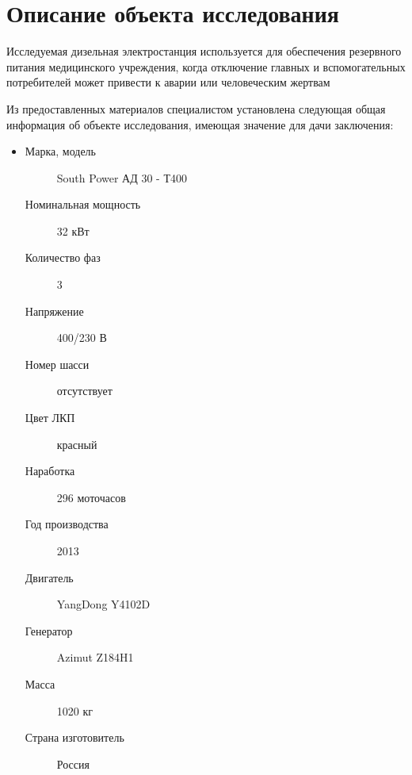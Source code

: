 %
%
%

\section{Описание объекта исследования}

Исследуемая дизельная электростанция используется для обеспечения резервного питания медицинского учреждения, когда  отключение главных и вспомогательных потребителей может привести к аварии или человеческим жертвам

\par Из предоставленных материалов   специалистом  установлена следующая общая информация об объекте исследования, имеющая значение для дачи заключения:
\parbox[90mm]{10cm}{}
\begin{itemize}
	\item[ ] 
	\begin{description}
		\item[Марка, модель] \hfill South Power АД 30 - Т400
		\item[Номинальная мощность] \hfill 32 кВт
		\item[Количество фаз] \hfill 3
    	\item[Напряжение] \hfill 400/230 В
		\item[Номер шасси] \hfill отсутствует
		\item[Цвет ЛКП] \hfill красный
		\item[Наработка] \hfill  296  моточасов
		\item[Год производства] \hfill 2013 
		\item[Двигатель] \hfill YangDong Y4102D
		\item[Генератор] \hfill Azimut Z184H1
		\item[Масса] \hfill 1020 кг
	\item[Страна изготовитель] \hfill Россия
	\end{description}
\end{itemize}

